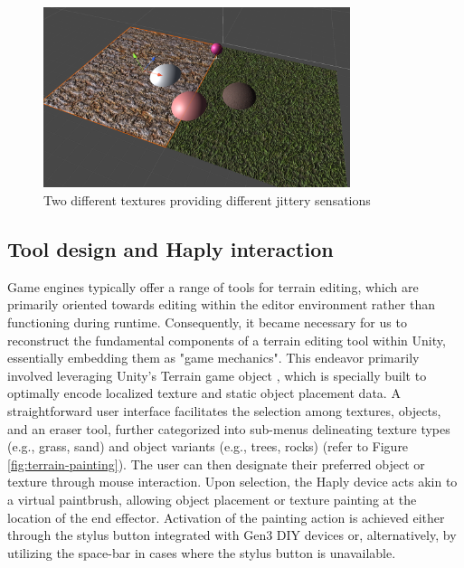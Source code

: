 \begin{figure}[htbp]
    \centering
    \includegraphics[width=0.8\textwidth]{images/approach-texture-rendering.png} 
    \caption{Two different textures providing different jittery sensations}
    \label{fig:texture-rendering}
\end{figure}

\subsection{Tool design and Haply interaction} \label{subsec:terrain-painting}

Game engines typically offer a range of tools for terrain editing, which are primarily oriented towards editing within the editor environment rather than functioning during runtime. Consequently, it became necessary for us to reconstruct the fundamental components of a terrain editing tool within Unity, essentially embedding them as "game mechanics". This endeavor primarily involved leveraging Unity's Terrain game object \cite{unityterrain}, which is specially built to optimally encode localized texture and static object placement data. A straightforward user interface facilitates the selection among textures, objects, and an eraser tool, further categorized into sub-menus delineating texture types (e.g., grass, sand) and object variants (e.g., trees, rocks) (refer to Figure \ref{fig:terrain-painting}). The user can then designate their preferred object or texture through mouse interaction. Upon selection, the Haply device acts akin to a virtual paintbrush, allowing object placement or texture painting at the location of the end effector. Activation of the painting action is achieved either through the stylus button integrated with Gen3 DIY devices or, alternatively, by utilizing the space-bar in cases where the stylus button is unavailable.

